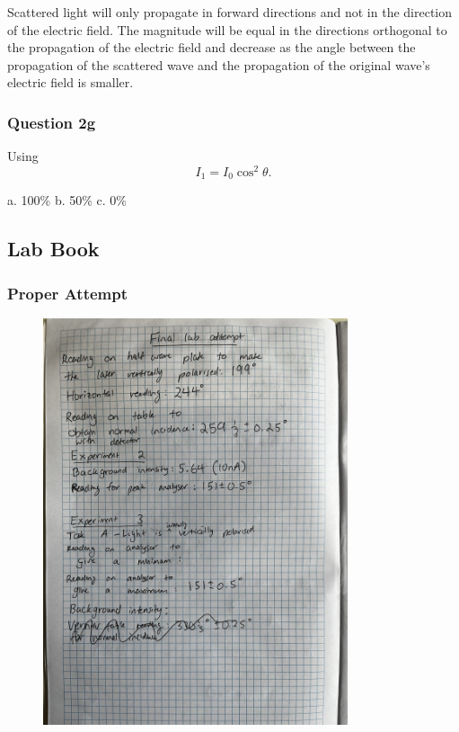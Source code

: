 \documentclass{article}
\begin{document}
Scattered light will only propagate in forward directions and not in the 
direction of the electric field. The magnitude will be equal in the 
directions orthogonal to the propagation of the electric field and decrease
as the angle between the propagation of the scattered wave and the propagation 
of the original wave's electric field is smaller.

\subsubsection{Question 2g}
Using
\begin{equation}
    I_1 = I_0 \cos^2{\theta}.
\end{equation}

a. 100\%
b. 50\%
c. 0\%
\subsection{Lab Book}
\subsubsection{Proper Attempt}

\begin{figure}[H]
    \centering
    \includegraphics[width=0.8\textwidth,angle=270,origin=c]{labbook10.jpg}
\end{figure}
\end{document}
